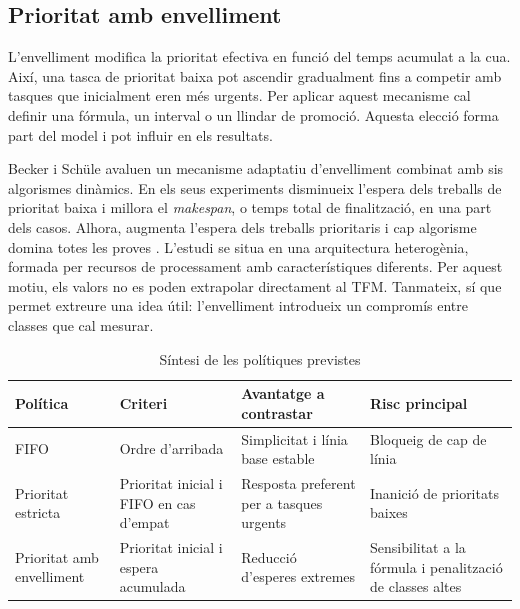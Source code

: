 \subsection{Prioritat amb envelliment}

L'envelliment modifica la prioritat efectiva en funció del temps acumulat a la
cua. Així, una tasca de prioritat baixa pot ascendir gradualment fins a competir
amb tasques que inicialment eren més urgents. Per aplicar aquest mecanisme cal
definir una fórmula, un interval o un llindar de promoció. Aquesta elecció forma
part del model i pot influir en els resultats.

Becker i Schüle avaluen un mecanisme adaptatiu d'envelliment combinat amb sis
algorismes dinàmics. En els seus experiments disminueix l'espera dels treballs
de prioritat baixa i millora el \emph{makespan}, o temps total de finalització,
en una part dels casos. Alhora, augmenta l'espera dels treballs prioritaris i
cap algorisme domina totes les proves \parencite{becker2020aging}. L'estudi se
situa en una arquitectura heterogènia, formada per recursos de processament amb
característiques diferents. Per aquest motiu, els valors no es poden extrapolar
directament al TFM. Tanmateix, sí que permet extreure una idea útil:
l'envelliment introdueix un compromís entre classes que cal mesurar.

\begin{table}[htbp]
  \centering
  \caption{Síntesi de les polítiques previstes}
  \label{tab:politiques}
  \begin{tabularx}{\textwidth}{@{}p{2.4cm}X X X@{}}
    \toprule
    Política & Criteri & Avantatge a contrastar & Risc principal \\
    \midrule
    FIFO & Ordre d'arribada & Simplicitat i línia base estable & Bloqueig de cap de línia \\
    Prioritat estricta & Prioritat inicial i FIFO en cas d'empat & Resposta preferent per a tasques urgents & Inanició de prioritats baixes \\
    Prioritat amb envelliment & Prioritat inicial i espera acumulada & Reducció d'esperes extremes & Sensibilitat a la fórmula i penalització de classes altes \\
    \bottomrule
  \end{tabularx}
\end{table}
